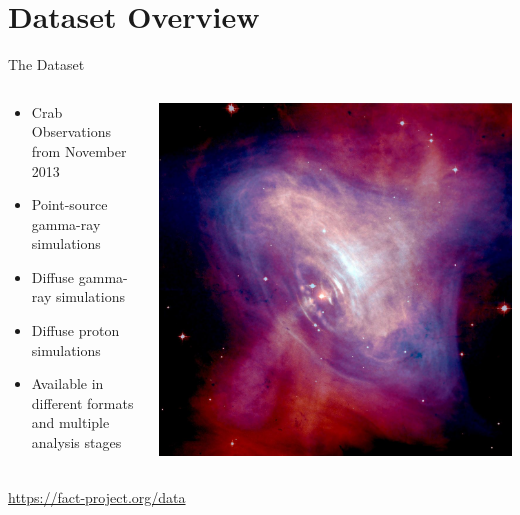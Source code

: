 \documentclass[compress, 9pt, aspectratio=1610, professionalfonts]{beamer}
\begin{document}
\section{Dataset Overview}
\begin{frame}[c]{The Dataset}
  \begin{columns}[onlytextwidth]
    \begin{column}{0.55\textwidth}      
      \begin{itemize}
        \item Crab Observations from November 2013
        \item Point-source gamma-ray simulations
        \item Diffuse gamma-ray simulations
        \item Diffuse proton simulations
        \item Available in different formats and multiple analysis stages
      \end{itemize}
    \end{column}
    \hfill
    \begin{column}{0.4\textwidth}      
      \hfill
      \includegraphics[width=0.75\textheight]{images/crab_chandra.jpg}
    \end{column}
  \end{columns}
  \vspace{0.5cm}
  \begin{center}
    \LARGE\url{https://fact-project.org/data}
  \end{center}
\end{frame}
\end{document}
